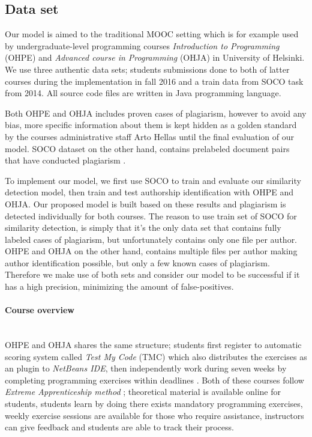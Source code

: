 \subsection{Data set}

Our model is aimed to the traditional MOOC setting which is for example used by  undergraduate-level programming courses \emph{Introduction to Programming} (OHPE) and \emph{Advanced course in Programming} (OHJA) in University of Helsinki. We use three authentic data sets; students submissions done to both of latter courses during the implementation in fall 2016 and a train data from SOCO task from 2014. All source code files are written in Java programming language. 

Both OHPE and OHJA includes proven cases of plagiarism, however to avoid any bias, more specific information about them is kept hidden as a golden standard by the courses administrative staff Arto Hellas until the final evaluation of our model. SOCO dataset on the other hand, contains prelabeled document pairs that have conducted plagiarism \cite{saez2014pan}.

To implement our model, we first use SOCO to train and evaluate our similarity detection model, then train and test authorship identification with OHPE and OHJA. Our proposed model is built based on these results and plagiarism is detected individually for both courses. The reason to use train set of SOCO for similarity detection, is simply that it's the only data set that contains fully labeled cases of plagiarism, but unfortunately contains only one file per author. OHPE and OHJA on the other hand, contains multiple files per author making author identification possible, but only a few known cases of plagiarism. Therefore we make use of both sets and consider our model to be successful if it has a high precision, minimizing the amount of false-positives. 

\paragraph{Course overview}\mbox{}\\
OHPE and OHJA shares the same structure; students first register to automatic scoring system called \emph{Test My Code} (TMC) \cite{Vihavainen:2013:SSL:2462476.2462501} which also distributes the exercises as an plugin to \emph{NetBeans IDE}, then independently work during seven weeks by completing programming exercises within deadlines \cite{Vihavainen:2012:MSM:2380552.2380603}. Both of these courses follow \emph{Extreme Apprenticeship method} \cite{Vihavainen:2011:EAM:1953163.1953196}; theoretical material is available online for students, students learn by doing \ie there exists mandatory programming exercises, weekly exercise sessions are available for those who require assistance, instructors can give feedback and students are able to track their process. 

